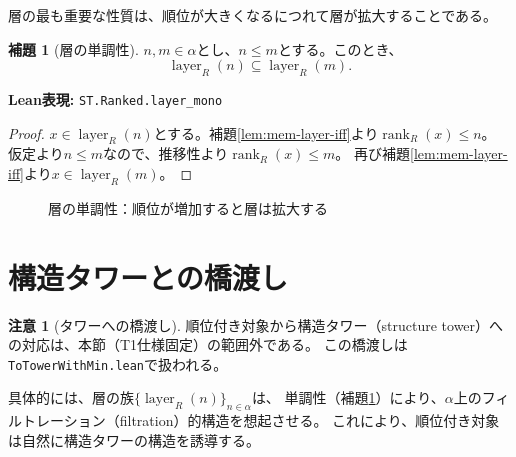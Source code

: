 \documentclass[12pt,a4paper]{ltjsarticle}
\theoremstyle{definition}
\newtheorem{lemma}[definition]{補題}
\newtheorem{remark}[definition]{注意}
\begin{document}
層の最も重要な性質は、順位が大きくなるにつれて層が拡大することである。

\begin{lemma}[層の単調性]\label{lem:layer-mono}
$n, m \in \alpha$とし、$n \le m$とする。このとき、
\[
  \operatorname{layer}_R(n) \subseteq \operatorname{layer}_R(m).
\]

\medskip
\noindent
\textbf{Lean表現:} \texttt{ST.Ranked.layer\_mono}
\end{lemma}

\begin{proof}
$x \in \operatorname{layer}_R(n)$とする。補題\ref{lem:mem-layer-iff}より$\operatorname{rank}_R(x) \le n$。
仮定より$n \le m$なので、推移性より$\operatorname{rank}_R(x) \le m$。
再び補題\ref{lem:mem-layer-iff}より$x \in \operatorname{layer}_R(m)$。
\end{proof}

\begin{figure}[ht]
\centering
{}
\caption{層の単調性：順位が増加すると層は拡大する}
\label{fig:layer-mono}
\end{figure}

\section{構造タワーとの橋渡し}

\begin{remark}[タワーへの橋渡し]
順位付き対象から構造タワー（structure tower）への対応は、本節（T1仕様固定）の範囲外である。
この橋渡しは\texttt{ToTowerWithMin.lean}で扱われる。

具体的には、層の族$\{\operatorname{layer}_R(n)\}_{n \in \alpha}$は、
単調性（補題\ref{lem:layer-mono}）により、$\alpha$上のフィルトレーション（filtration）的構造を想起させる。
これにより、順位付き対象は自然に構造タワーの構造を誘導する。
\end{remark}
\end{document}
